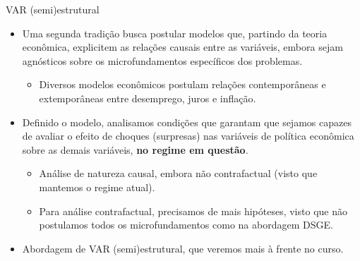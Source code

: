 \documentclass[11pt]{beamer}
\begin{document}
\begin{frame}{VAR (semi)estrutural}
	\begin{itemize}
	 	\item Uma segunda tradição busca postular modelos que, partindo da teoria econômica, explicitem as relações causais entre as variáveis, embora sejam agnósticos sobre os microfundamentos específicos dos problemas.
	 	\begin{itemize}
	 		\item Diversos modelos econômicos postulam relações contemporâneas e extemporâneas entre desemprego, juros e inflação.
	 	\end{itemize}
	 	\item Definido o modelo, analisamos condições que garantam que sejamos capazes de avaliar o efeito de choques (surpresas) nas variáveis de política econômica sobre as demais variáveis, \textbf{no regime em questão}.
	 	\begin{itemize}
	 		\item Análise de natureza causal, embora não contrafactual (visto que mantemos o regime atual).
	 		\item Para análise contrafactual, precisamos de mais hipóteses, visto que não postulamos todos os microfundamentos como na abordagem DSGE.
	 	\end{itemize}
	 	\item Abordagem de VAR (semi)estrutural, que veremos mais à frente no curso.
	\end{itemize}
\end{frame}
\end{document}
